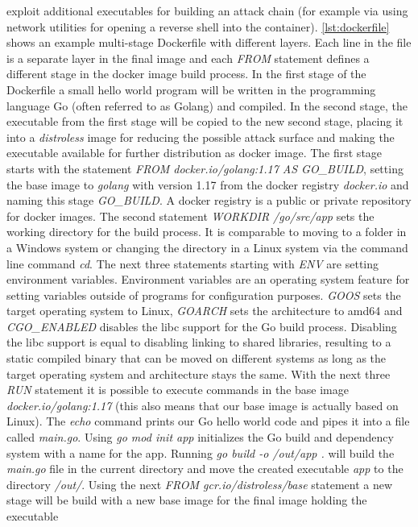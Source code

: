 \documentclass[titlepage]{report}
\begin{document}
exploit additional executables for building an attack chain (for example via using network utilities for opening a reverse shell into the container).
\autoref{lst:dockerfile} shows an example multi-stage Dockerfile with different layers. Each line in the file is a separate layer in the final image
and each \emph{FROM} statement defines a different stage in the docker image build process. In the first stage of the Dockerfile
a small hello world program will be written in the programming language Go (often referred to as Golang) and compiled. In the second stage,
the executable from the first stage will be copied to the new second stage, placing it into a \emph{distroless} image for reducing the possible
attack surface and making the executable available for further distribution as docker image. The first stage starts with the statement
\emph{FROM docker.io/golang:1.17 AS GO\_BUILD}, setting the base image to \emph{golang} with version 1.17 from the docker registry \emph{docker.io}
and naming this stage \emph{GO\_BUILD}. A docker registry is a public or private repository for docker images. 
The second statement \emph{WORKDIR /go/src/app} sets the working directory for the build process. It is comparable to moving to a folder
in a Windows system or changing the directory in a Linux system via the command line command \emph{cd}. The next three statements starting
with \emph{ENV} are setting environment variables. Environment variables are an operating system feature for setting variables outside
of programs for configuration purposes. \emph{GOOS} sets the target operating system to Linux, \emph{GOARCH} sets the architecture to amd64
and \emph{CGO\_ENABLED} disables the libc support for the Go build process. Disabling the libc support is equal to disabling linking
to shared libraries, resulting to a static compiled binary that can be moved on different systems as long as the target operating system
and architecture stays the same. With the next three \emph{RUN} statement it is possible to execute commands in the base image
\emph{docker.io/golang:1.17} (this also means that our base image is actually based on Linux). The \emph{echo} command
prints our Go hello world code and pipes it into a file called \emph{main.go}. Using \emph{go mod init app} initializes
the Go build and dependency system with a name for the app. Running \emph{go build -o /out/app .} will build the \emph{main.go}
file in the current directory and move the created executable \emph{app} to the directory \emph{/out/}. Using the next
\emph{FROM gcr.io/distroless/base} statement a new stage will be build with a new base image for the final image holding the executable
\end{document}
